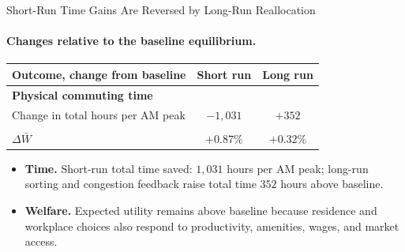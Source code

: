 \documentclass[11pt,aspectratio=169]{beamer}
\newcommand{\good}[1]{\textcolor{blue!70!black}{#1}}
\newcommand{\bad}[1]{\textcolor{red!70!black}{#1}}
\begin{document}
\begin{frame}[label=result2]{Short-Run Time Gains Are Reversed by Long-Run Reallocation}
\framesubtitle{Changes relative to the baseline equilibrium.}
\centering
\vspace{0.25em}
\scriptsize
\renewcommand{\arraystretch}{1.22}
\setlength{\tabcolsep}{14pt}
\begin{tabular}{lcc}
\toprule
Outcome, change from baseline & Short run & Long run \\
\midrule
\multicolumn{3}{l}{\textbf{Physical commuting time}} \\
Change in total hours per AM peak & \good{$-1{,}031$} & \bad{$+352$} \\
\addlinespace[0.25em]
\multicolumn{3}{l}{\textbf{Expected-utility welfare}} \\
$\Delta\bar W$ & \good{$+0.87\%$} & \good{$+0.32\%$} \\
\bottomrule
\end{tabular}

\vspace{0.85em}
\begin{itemize}\footnotesize\setlength\itemsep{0.35em}
  \item \textbf{Time.} Short-run total time saved: $1{,}031$ hours per AM peak; long-run sorting and congestion feedback raise total time $352$ hours above baseline.
  \item \textbf{Welfare.} Expected utility remains above baseline because residence and workplace choices also respond to productivity, amenities, wages, and market access.
\end{itemize}
\end{frame}
\end{document}
